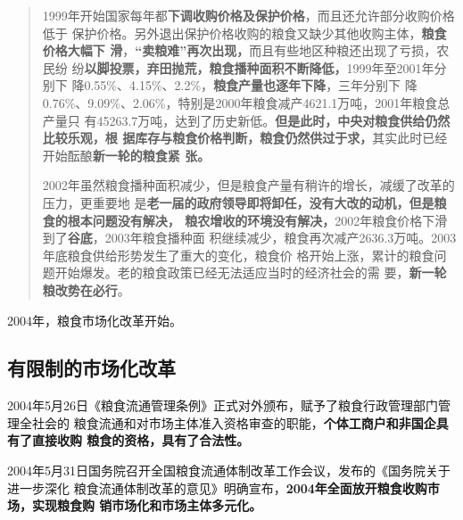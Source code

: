 \begin{quotation}
  1999年开始国家每年都\textbf{下调收购价格及保护价格}，而且还允许部分收购价格低于
  保护价格。另外退出保护价格收购的粮食又缺少其他收购主体，\textbf{粮食价格大幅下
    滑}，\textbf{“卖粮难”再次出现，}而且有些地区种粮还出现了亏损，农民纷
  纷\textbf{以脚投票，弃田抛荒，粮食播种面积不断降低，}1999年至2001年分别下
  降0.55\%、4.15\%、2.2\%，\textbf{粮食产量也逐年下降}，三年分别下
  降0.76\%、9.09\%、2.06\%，特别是2000年粮食减产4621.1万吨，2001年粮食总产量只
  有45263.7万吨，达到了历史新低。\textbf{但是此时，中央对粮食供给仍然比较乐观，根
    据库存与粮食价格判断，粮食仍然供过于求，}其实此时已经开始酝酿\textbf{新一轮的粮食紧
    张。}

  2002年虽然粮食播种面积减少，但是粮食产量有稍许的增长，减缓了改革的压力，更重要地
  是\textbf{老一届的政府领导即将卸任，没有大改的动机，但是粮食的根本问题没有解决，
    粮农增收的环境没有解决，}2002年粮食价格下滑到了\textbf{谷底}，2003年粮食播种面
  积继续减少，粮食再次减产2636.3万吨。2003年底粮食供给形势发生了重大的变化，粮食价
  格开始上涨，累计的粮食问题开始爆发。老的粮食政策已经无法适应当时的经济社会的需
  要，\textbf{新一轮粮改势在必行}。
\end{quotation}

2004年，粮食市场化改革开始。

\subsection{有限制的市场化改革}


2004年5月26日《粮食流通管理条例》正式对外颁布，赋予了粮食行政管理部门管理全社会的
粮食流通和对市场主体准入资格审查的职能，\textbf{个体工商户和非国企具有了直接收购
  粮食的资格，具有了合法性。}

2004年5月31日国务院召开全国粮食流通体制改革工作会议，发布的《国务院关于进一步深化
粮食流通体制改革的意见》明确宣布，\textbf{2004年全面放开粮食收购市场，实现粮食购
  销市场化和市场主体多元化。}


